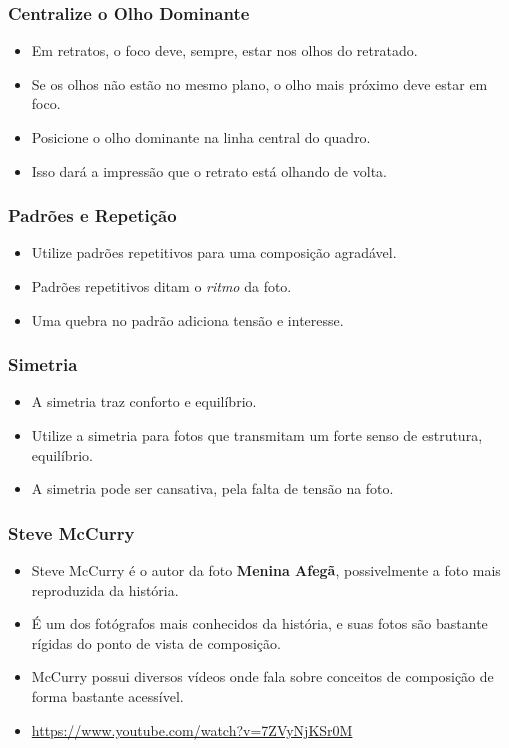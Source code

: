 \begin{frame}
    \frametitle{Centralize o Olho Dominante}
    \begin{itemize}
      \item Em retratos, o foco deve, sempre, estar nos olhos do retratado.
      \item Se os olhos não estão no mesmo plano, o olho mais próximo deve estar em foco.
      \item Posicione o olho dominante na linha central do quadro.
      \item Isso dará a impressão que o retrato está olhando de volta.
    \end{itemize}
\end{frame}

\begin{frame}
    \frametitle{Padrões e Repetição}
    \begin{itemize}
      \item Utilize padrões repetitivos para uma composição agradável.
      \item Padrões repetitivos ditam o \textit{ritmo} da foto.
      \item Uma quebra no padrão adiciona tensão e interesse.
    \end{itemize}
\end{frame}

\begin{frame}
    \frametitle{Simetria}
    \begin{itemize}
      \item A simetria traz conforto e equilíbrio.
      \item Utilize a simetria para fotos que transmitam um forte senso de estrutura, equilíbrio.
      \item A simetria pode ser cansativa, pela falta de tensão na foto.
    \end{itemize}
\end{frame}

\begin{frame}
    \frametitle{Steve McCurry}
    \begin{itemize}
      \item Steve McCurry é o autor da foto \textbf{Menina Afegã}, possivelmente a foto mais
      reproduzida da história.
      \item É um dos fotógrafos mais conhecidos da história, e suas fotos são bastante
      rígidas do ponto de vista de composição.
      \item McCurry possui diversos vídeos onde fala sobre conceitos de composição de
      forma bastante acessível.
      \item \url{https://www.youtube.com/watch?v=7ZVyNjKSr0M}
    \end{itemize}
\end{frame}


